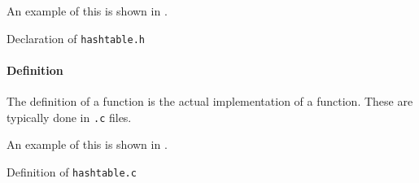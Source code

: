 An example of this is shown in .

\begin{listing}[h!tbp]
\caption{Declaration of \texttt{hashtable.h}}
\label{lst:Function_Declaration_hashtable}
\end{listing}

\paragraph{Definition}\label{par:Function_Definition}
The definition of a function is the actual implementation of a function.
These are typically done in \texttt{.c} files.

An example of this is shown in .

\begin{listing}[h!tbp]
\caption{Definition of \texttt{hashtable.c}}
\label{lst:Function_Definition_hashtable}
\end{listing}


